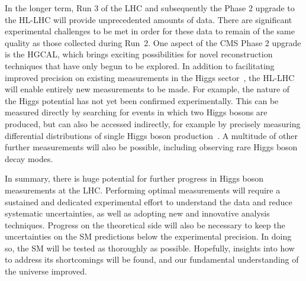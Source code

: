In the longer term, Run 3 of the LHC and subsequently the Phase 2 upgrade to the HL-LHC 
will provide unprecedented amounts of data.
There are significant experimental challenges to be met in order for these data 
to remain of the same quality as those collected during Run~2.
One aspect of the CMS Phase 2 upgrade is the HGCAL, 
which brings exciting possibilities for novel reconstruction techniques 
that have only begun to be explored.
In addition to facilitating improved precision on existing measurements 
in the Higgs sector~\cite{FutureYR}, the HL-LHC will enable entirely new measurements to be made.
For example, the nature of the Higgs potential has not yet been confirmed experimentally.
This can be measured directly by searching for events in which two Higgs bosons are produced, 
but can also be accessed indirectly, 
for example by precisely measuring differential distributions 
of single Higgs boson production~\cite{JonnoPAS}.
A multitude of other further measurements will also be possible, 
including observing rare Higgs boson decay modes.

In summary, there is huge potential for further progress in Higgs boson measurements at the LHC.
Performing optimal measurements will require a sustained and dedicated experimental effort
to understand the data and reduce systematic uncertainties, 
as well as adopting new and innovative analysis techniques.
Progress on the theoretical side will also be necessary 
to keep the uncertainties on the SM predictions below the experimental precision.
In doing so, the SM will be tested as thoroughly as possible.
Hopefully, insights into how to address its shortcomings will be found,
and our fundamental understanding of the universe improved.
